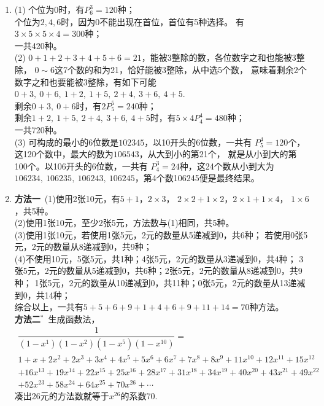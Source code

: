 \begin{enumerate}[label={\textbf{\arabic*.}},leftmargin=
    \inteval{\myenumleftmargin}pt]
\item (1) 个位为0时，有$P_6^3=120$种；\\
个位为$2,4,6$时，因为0不能出现在首位，首位有5种选择。
有$ 3\times 5 \times 5 \times 4= 300 $种；\\
一共420种。\\
(2) $0+1+2+3+4+5+6=21$，能被3整除的数，各位数字之和也能被3整除，
$ 0\sim 6 $这7个数的和为21，恰好能被3整除，从中选5个数，
意味着剩余2个数字之和也要能被3整除，有如下可能
$ 0+3,\ 0+6,\ 1+2,\ 1+5,\ 2+4,\ 3+6,\ 4+5 $.\\
剩余$0+3,\ 0+6$时，有$2P_5^5=240$种；\\
剩余$1+2,\ 1+5,\ 2+4,\ 3+6,\ 4+5 $时，有$5\times4 P_4^4=480$种；\\
一共720种。\\
(3) 可构成的最小的6位数是$ 102345 $，以10开头的6位数，一共有
$P_5^4=120$个，这120个数中，最大的数为$106543$，从大到小的第21个，
就是从小到大的第100个。以106开头的6位数，一共有
$P_4^3=24 $种，这24个数从小到大为$106234,\ 106235,
\ 106243,\ 106245 $，第4个数106245便是最终结果。

\item \textbf{方法一}\ 
(1)使用2张10元，有$ 5+1 $，$ 2\times 3 $，
$ 2\times 2+1\times 2 $，$ 2\times 1+1\times 4 $，
$ 1\times 6 $，共5种。\\
(2)使用1张10元，至少2张5元，方法数与(1)相同，共5种。\\
(3)使用1张10元，若使用1张5元，2元的数量从5递减到0，共6种；
若使用0张5元，2元的数量从8递减到0，共9种；\\
(4)不使用10元，5张5元，共1种；4张5元，2元的数量从3递减到0，共4种；
3张5元，2元的数量从5递减到0，共6种；2张5元，2元的数量从8递减到0，共9种；
1张5元，2元的数量从10递减到0，共11种；0张5元，2元的数量从13递减到0，共14种；\\
综合以上，一共有$ 5+5+6+9+1+4+6+9+11+14=70 $种方法。\\
\textbf{方法二}$ ^* $\ 生成函数法，
\begin{gather*}
    \dfrac{1}{(1-x^1)(1-x^2)(1-x^{5})(1-x^{10})}=\\
    1+x+2x^{2}+2x^{3}+3x^{4}+4x^{5}+5x^{6}+6x^{7}+7x^{8}+8x^{9}+11x^{10}+12x^{11}+15x^{12}\\ +16x^{13}+19x^{14}+22x^{15}+25x^{16}+28x^{17}+31x^{18}+34x^{19}+40x^{20}+43x^{21}+49x^{22}\\
    +52x^{23}+58x^{24}+64x^{25}+70x^{26}+\cdots
\end{gather*}
凑出26元的方法数就等于$ x^{26} $的系数70. 
 
\end{enumerate}
\myfootnote{\CopyrightStatementChap}
\cleardoublepage

